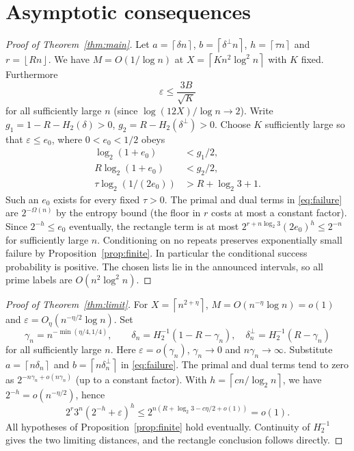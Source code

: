 \documentclass[11pt]{article}
\theoremstyle{remark}\newtheorem{remark}[theorem]{Remark}
\newcommand{\eps}{\varepsilon}
\newcommand{\Hbin}{H_2}
\newcommand{\floor}[1]{\left\lfloor #1\right\rfloor}
\newcommand{\ceil}[1]{\left\lceil #1\right\rceil}
\begin{document}
\section{Asymptotic consequences}
\begin{proof}[Proof of Theorem~\ref{thm:main}]
Let $a=\ceil{\delta n}$, $b=\ceil{\delta^\perp n}$, $h=\ceil{\tau n}$ and $r=\floor{Rn}$. We have $M=O(1/\log n)$ at $X=\ceil{Kn^2\log^2n}$ with $K$ fixed. Furthermore
\[
 \eps\le \frac{3B}{\sqrt K}
\]
for all sufficiently large $n$ (since $\log(12X)/\log n\to2$). Write $g_1=1-R-\Hbin(\delta)>0$, $g_2=R-\Hbin(\delta^\perp)>0$. Choose $K$ sufficiently large so that $\eps\le e_0$, where $0<e_0<1/2$ obeys
\begin{align*}
 \log_2(1+e_0)&<g_1/2,\\
 R\log_2(1+e_0)&<g_2/2,\\
 \tau\log_2(1/(2e_0))&>R+\log_2 3+1.
\end{align*}
Such an $e_0$ exists for every fixed $\tau>0$. The primal and dual terms in \eqref{eq:failure} are $2^{-\Omega(n)}$ by the entropy bound (the floor in $r$ costs at most a constant factor). Since $2^{-h}\le e_0$ eventually, the rectangle term is at most $2^{r+n\log_2 3}(2e_0)^h\le2^{-n}$ for sufficiently large $n$. Conditioning on no repeats preserves exponentially small failure by Proposition~\ref{prop:finite}. In particular the conditional success probability is positive. The chosen lists lie in the announced intervals, so all prime labels are $O(n^2\log^2 n)$.
\end{proof}
\begin{proof}[Proof of Theorem~\ref{thm:limit}]
For $X=\ceil{n^{2+\eta}}$, $M=O(n^{-\eta}\log n)=o(1)$ and $\eps=O_\eta(n^{-\eta/2}\log n)$. Set
\[
 \gamma_n=n^{-\min(\eta/4,1/4)},\qquad
 \delta_n=\Hbin^{-1}(1-R-\gamma_n),\quad
 \delta_n^\perp=\Hbin^{-1}(R-\gamma_n)
\]
for all sufficiently large $n$. Here $\eps=o(\gamma_n)$, $\gamma_n\to0$ and $n\gamma_n\to\infty$. Substitute $a=\ceil{n\delta_n}$ and $b=\ceil{n\delta_n^\perp}$ in \eqref{eq:failure}. The primal and dual terms tend to zero as $2^{-n\gamma_n+o(n\gamma_n)}$ (up to a constant factor). With $h=\ceil{cn/\log_2 n}$, we have $2^{-h}=o(n^{-\eta/2})$, hence
\[
 2^r3^n(2^{-h}+\eps)^h
 \le 2^{n(R+\log_2 3-c\eta/2+o(1))}=o(1).
\]
All hypotheses of Proposition~\ref{prop:finite} hold eventually. Continuity of $\Hbin^{-1}$ gives the two limiting distances, and the rectangle conclusion follows directly.
\end{proof}
\end{document}
